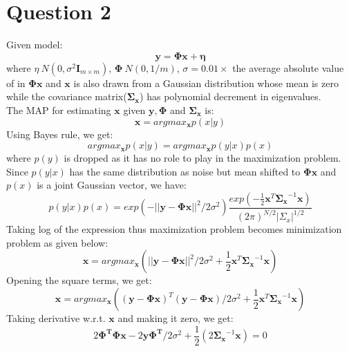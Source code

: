 \documentclass[12pt]{article}
\begin{document}
\section*{Question 2}
Given model:
\begin{equation*}
	\boldsymbol{y} = \boldsymbol{\Phi x} + \boldsymbol{\eta}
\end{equation*}
where $\eta ~ \textit{N}(0, \sigma^2\boldsymbol{I}_{m\times m})$, $\boldsymbol{\Phi} ~ \textit{N}(0, 1/m)$, $\sigma = 0.01\times$ the average absolute value of in $\boldsymbol{\Phi x}$ and $\boldsymbol{x}$ is also drawn from a Gaussian distribution whose mean is zero while the covariance matrix($\boldsymbol{\Sigma_x}$) has polynomial decrement in eigenvalues.\\
The MAP for estimating $\boldsymbol{x}$ given $\boldsymbol{y}, \boldsymbol{\Phi}$ and $\boldsymbol{\Sigma_x}$ is:
\begin{equation*}
	\boldsymbol{x} = argmax_{\boldsymbol{x}} p(x|y)
\end{equation*}
Using Bayes rule, we get:
\begin{equation*}
	argmax_{\boldsymbol{x}} p(x|y) = argmax_{\boldsymbol{x}} p(y|x)p(x)
\end{equation*}
where $p(y)$ is dropped as it has no role to play in the maximization problem. Since $p(y|x)$ has the same distribution as noise but mean shifted to $\boldsymbol{\Phi x}$ and $p(x)$ is a joint Gaussian vector, we have:
\begin{equation*}
	p(y|x)p(x) = exp(-||\boldsymbol{y}-\boldsymbol{\Phi x}||^2/2\sigma^2)\frac{exp(-\frac{1}{2}\boldsymbol{x}^T\boldsymbol{\Sigma_x}^{-1}\boldsymbol{x})}{(2\pi)^{N/2}|\Sigma_x|^{1/2}}
\end{equation*}
Taking log of the expression thus maximization problem becomes minimization problem as given below:
\begin{equation*}
	\boldsymbol{x} = argmax_{\boldsymbol{x}} (||\boldsymbol{y}-\boldsymbol{\Phi x}||^2/2\sigma^2+\frac{1}{2}\boldsymbol{x}^T\boldsymbol{\Sigma_x}^{-1}\boldsymbol{x})
\end{equation*}
Opening the square terms, we get:
\begin{equation*}
	\boldsymbol{x} = argmax_{\boldsymbol{x}} ((\boldsymbol{y}-\boldsymbol{\Phi x})^T (\boldsymbol{y}-\boldsymbol{\Phi x})/2\sigma^2+\frac{1}{2}\boldsymbol{x}^T\boldsymbol{\Sigma_x}^{-1}\boldsymbol{x})
\end{equation*}
Taking derivative w.r.t. $\boldsymbol{x}$ and making it zero, we get:
\begin{equation*}
	2\boldsymbol{\Phi^T \Phi x} - 2\boldsymbol{y}\boldsymbol{\Phi^T}/2\sigma^2+\frac{1}{2}(2\boldsymbol{\Sigma_x}^{-1}\boldsymbol{x}) = 0
\end{equation*}
\end{document}

